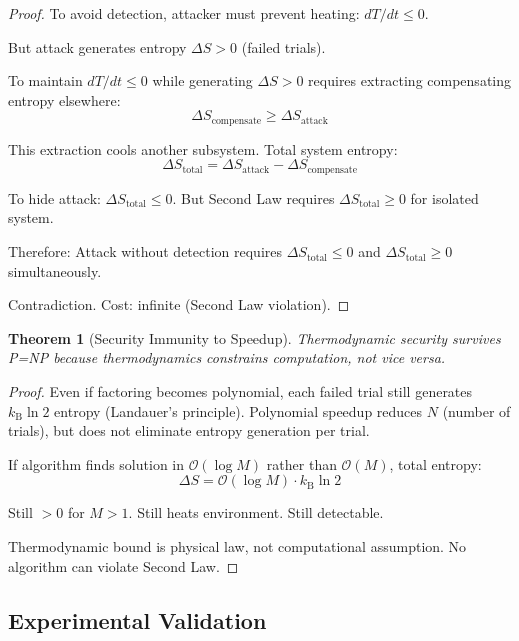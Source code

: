 \documentclass[twocolumn,10pt]{revtex4-2}
\newtheorem{theorem}{Theorem}[section]
\theoremstyle{definition}
\theoremstyle{remark}
\newcommand{\kB}{k_{\mathrm{B}}}
\newcommand{\bigO}{\mathcal{O}}
\begin{document}
\begin{proof}
To avoid detection, attacker must prevent heating: $dT/dt \leq 0$.

But attack generates entropy $\Delta S > 0$ (failed trials).

To maintain $dT/dt \leq 0$ while generating $\Delta S > 0$ requires extracting compensating entropy elsewhere:
\begin{equation}
\Delta S_{\text{compensate}} \geq \Delta S_{\text{attack}}
\end{equation}

This extraction cools another subsystem. Total system entropy:
\begin{equation}
\Delta S_{\text{total}} = \Delta S_{\text{attack}} - \Delta S_{\text{compensate}}
\end{equation}

To hide attack: $\Delta S_{\text{total}} \leq 0$. But Second Law requires $\Delta S_{\text{total}} \geq 0$ for isolated system.

Therefore: Attack without detection requires $\Delta S_{\text{total}} \leq 0$ and $\Delta S_{\text{total}} \geq 0$ simultaneously.

Contradiction. Cost: infinite (Second Law violation).
\end{proof}

\begin{theorem}[Security Immunity to Speedup]
\label{thm:security_immunity}
Thermodynamic security survives P=NP because thermodynamics constrains computation, not vice versa.
\end{theorem}

\begin{proof}
Even if factoring becomes polynomial, each failed trial still generates $\kB \ln 2$ entropy (Landauer's principle). Polynomial speedup reduces $N$ (number of trials), but does not eliminate entropy generation per trial.

If algorithm finds solution in $\bigO(\log M)$ rather than $\bigO(M)$, total entropy:
\begin{equation}
\Delta S = \bigO(\log M) \cdot \kB \ln 2
\end{equation}

Still $> 0$ for $M > 1$. Still heats environment. Still detectable.

Thermodynamic bound is physical law, not computational assumption. No algorithm can violate Second Law.
\end{proof}

\subsection{Experimental Validation}
\end{document}
